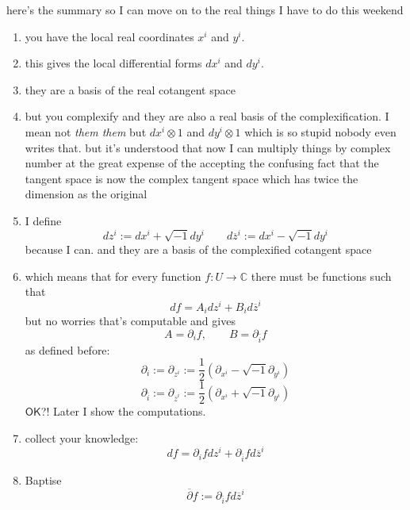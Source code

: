 here's the summary so I can move on to the real things I have to do this weekend
\begin{enumerate}
\item you have the local real coordinates \(x^i\) and \(y^i\).
\item this gives the local differential forms \(dx^i\) and \(dy^i\).
\item they are a basis of the real cotangent space
\item but you complexify and they are also a real basis of the complexification. I mean not \textit{them them} but \(dx^i \otimes 1\) and \(dy^i \otimes 1\) which is so stupid nobody even writes that. but it's understood that now I can multiply things by complex number at the great expense of the accepting the confusing fact that the tangent space is now the complex tangent space which has twice the dimension as the original
\item I define
	\[dz^i:=dx^i+\sqrt{-1}dy^i\qquad d\overline{z}^i:=dx^i-\sqrt{-1}dy^i\]
	because I can. and they are a basis of the complexified cotangent space
\item which means that for every function \(f:U \to \mathbb{C}\) there must be functions such that
	\[df=A_idz^i+B_id\overline{z}^i\]
but no worries that's computable and gives
\[A=\partial_if, \qquad B=\partial_{\bar{i} }f\]
as defined before: \[\partial_i:=\partial_{z^i}:=\frac{1}{2}(\partial_{x^i}-\sqrt{-1}\partial_{y^i})\]
\[\partial_{\bar{i}}:=\partial_{\overline{z}^i}:=\frac{1}{2}(\partial_{x^i}+\sqrt{-1}\partial_{y^i})\]
\(\mathsf{OK}\)?! 
Later I show the computations.
\item collect your knowledge:
	\[df=\partial_ifdz^i+\partial_{\bar{i}}fd\overline{z}^i\]
\item Baptise
\[\overline{\partial}f:=\partial_{\bar{i}}fd\overline{z}^i\]

\end{enumerate}
